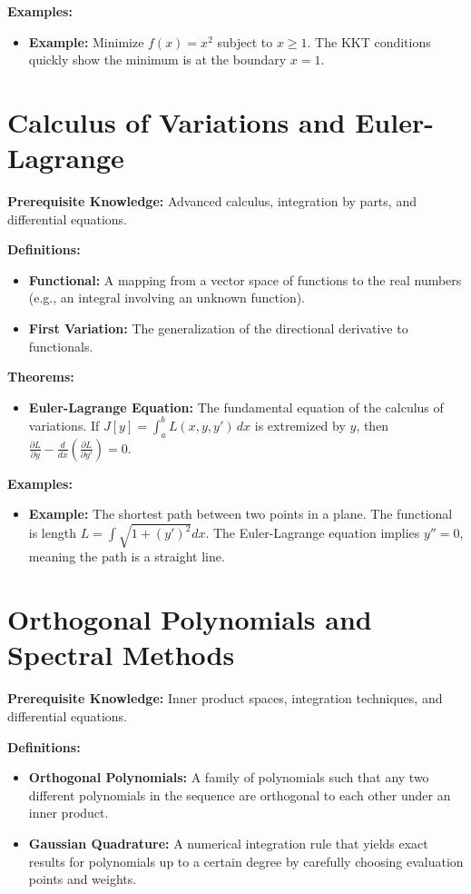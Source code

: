 \textbf{Examples:}
\begin{itemize}
    \item \textbf{Example:} Minimize $f(x) = x^2$ subject to $x \ge 1$. The KKT conditions quickly show the minimum is at the boundary $x=1$.
\end{itemize}


\section{Calculus of Variations and Euler-Lagrange}
\textbf{Prerequisite Knowledge:} Advanced calculus, integration by parts, and differential equations.

\textbf{Definitions:}
\begin{itemize}
    \item \textbf{Functional:} A mapping from a vector space of functions to the real numbers (e.g., an integral involving an unknown function).
    \item \textbf{First Variation:} The generalization of the directional derivative to functionals.
\end{itemize}

\textbf{Theorems:}
\begin{itemize}
    \item \textbf{Euler-Lagrange Equation:} The fundamental equation of the calculus of variations. If $J[y] = \int_a^b L(x, y, y')\,dx$ is extremized by $y$, then $\frac{\partial L}{\partial y} - \frac{d}{dx}\left(\frac{\partial L}{\partial y'}\right) = 0$.
\end{itemize}

\textbf{Examples:}
\begin{itemize}
    \item \textbf{Example:} The shortest path between two points in a plane. The functional is length $L = \int \sqrt{1 + (y')^2} dx$. The Euler-Lagrange equation implies $y'' = 0$, meaning the path is a straight line.
\end{itemize}


\section{Orthogonal Polynomials and Spectral Methods}
\textbf{Prerequisite Knowledge:} Inner product spaces, integration techniques, and differential equations.

\textbf{Definitions:}
\begin{itemize}
    \item \textbf{Orthogonal Polynomials:} A family of polynomials such that any two different polynomials in the sequence are orthogonal to each other under an inner product.
    \item \textbf{Gaussian Quadrature:} A numerical integration rule that yields exact results for polynomials up to a certain degree by carefully choosing evaluation points and weights.
\end{itemize}

